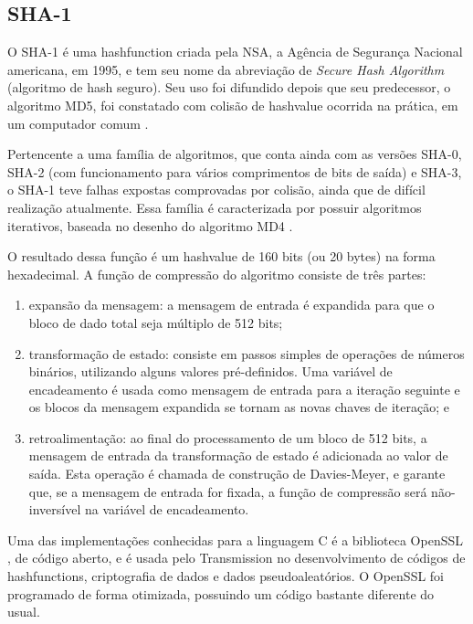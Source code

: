 
\subsection*{SHA-1}

O SHA-1 é uma \gls*{hashfunction} criada pela NSA, a Agência de Segurança Nacional
americana, em 1995, e tem seu nome da abreviação de \emph{Secure Hash Algorithm}
(algoritmo de hash seguro). Seu uso foi difundido depois que seu predecessor, o
algoritmo MD5, foi constatado com colisão de \gls*{hashvalue} ocorrida na prática,
em um computador comum \cite{report:md5-attack}.

Pertencente a uma família de algoritmos, que conta ainda com as versões SHA-0, SHA-2
(com funcionamento para vários comprimentos de bits de saída) e SHA-3, o SHA-1 teve
falhas expostas comprovadas por colisão, ainda que de difícil realização atualmente.
Essa família é caracterizada por possuir algoritmos iterativos, baseada no desenho do
algoritmo MD4 \cite{report:md4}.

O resultado dessa função é um \gls*{hashvalue} de 160 bits (ou 20 bytes) na forma
hexadecimal. A função de compressão do algoritmo consiste de três partes:

\begin{enumerate}
    \item expansão da mensagem: a mensagem de entrada é expandida para que o bloco de
        dado total seja múltiplo de 512 bits;

    \item transformação de estado: consiste em passos simples de operações de números
        binários, utilizando alguns valores pré-definidos. Uma variável de encadeamento
        é usada como mensagem de entrada para a iteração seguinte e os blocos da
        mensagem expandida se tornam as novas chaves de iteração; e

    \item retroalimentação: ao final do processamento de um bloco de 512 bits, a
        mensagem de entrada da transformação de estado é adicionada ao valor de saída.
        Esta operação é chamada de construção de Davies-Meyer, e garante que, se a
        mensagem de entrada for fixada, a função de compressão será não-inversível na
        variável de encadeamento.
\end{enumerate}

Uma das implementações conhecidas para a linguagem C é a biblioteca OpenSSL
\cite{site:openssl}, de código aberto, e é usada pelo Transmission no desenvolvimento de
códigos de \glspl*{hashfunction}, criptografia de dados e dados pseudoaleatórios. O
OpenSSL foi programado de forma otimizada, possuindo um código bastante diferente do
usual.

